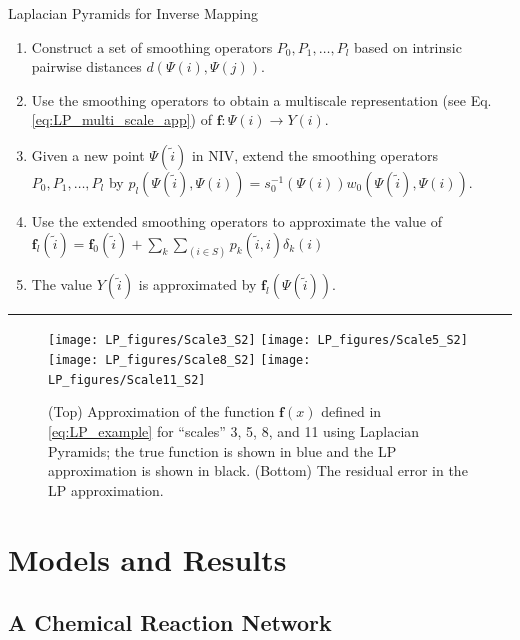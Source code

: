 \documentclass[aip,jcp,preprint]{revtex4-1}
\begin{document}
\begin{algorithm}[th!]
\caption{Laplacian Pyramids for Inverse Mapping}
\begin{enumerate}

\item
Construct a set of smoothing operators $P_0, P_1, \ldots, P_l$  based on intrinsic pairwise distances $d(\Psi(i),\Psi(j))$.

\item
Use the smoothing operators to obtain a multiscale representation (see Eq. \ref{eq:LP_multi_scale_app}) of $\mathbf{f}:\Psi(i) \rightarrow Y(i)$.

\item Given a new point $\Psi(\tilde{i})$ in NIV, extend the smoothing operators $P_0, P_1, \ldots, P_l$  by
$p_l(\Psi(\tilde{i}), \Psi(i)) = s_0^{-1}(\Psi(i))w_0(\Psi(\tilde{i}),\Psi(i))$.

\item
Use the extended smoothing operators to approximate the value of $\mathbf{f}_l(\tilde{i}) = \mathbf{f}_0(\tilde{i}) + \sum_{k}\sum_{(i \in S)}p_k(\tilde{i}, i)\delta_k(i)$

\item
The value $Y(\tilde{i})$ is approximated by $\mathbf{f}_l(\Psi(\tilde{i}))$.

\end{enumerate}
\hrule
\label{algo_LP}
\end{algorithm}


\begin{figure}[ht]
\texttt{[image: LP\_figures/Scale3\_S2]}
\texttt{[image: LP\_figures/Scale5\_S2]}
\texttt{[image: LP\_figures/Scale8\_S2]}
\texttt{[image: LP\_figures/Scale11\_S2]}
\caption{(Top) Approximation of the function $\mathbf{f}(x)$ defined in \eqref{eq:LP_example} for ``scales'' 3, 5, 8, and 11 using Laplacian Pyramids; the true function is shown in blue and the LP approximation is shown in black. (Bottom) The residual error in the LP approximation.}
\label{fig:LP_ex}
\end{figure}

\section{Models and Results} \label{sec:examples}

\subsection{A Chemical Reaction Network}\label{subsec:rxn_network}
\end{document}
